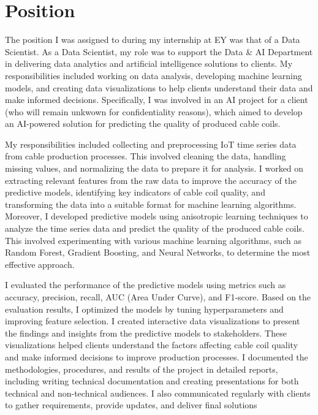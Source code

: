 \section{Position}

The position I was assigned to during my internship at EY was that of a Data
Scientist. As a Data Scientist, my role was to support the Data \& AI
Department in delivering data analytics and artificial intelligence solutions
to clients. My responsibilities included working on data analysis, developing
machine learning models, and creating data visualizations to help clients
understand their data and make informed decisions. Specifically, I was involved
in an AI project for a client (who will remain unkwown for confidentiality reasons),
which aimed to develop an AI-powered solution for predicting the quality of
produced cable coils.

My responsibilities included collecting and preprocessing IoT time series data
from cable production processes. This involved cleaning the data, handling
missing values, and normalizing the data to prepare it for analysis. I worked
on extracting relevant features from the raw data to improve the accuracy of
the predictive models, identifying key indicators of cable coil quality, and
transforming the data into a suitable format for machine learning algorithms.
Moreover, I developed predictive models using anisotropic learning techniques
to analyze the time series data and predict the quality of the produced cable
coils. This involved experimenting with various machine learning algorithms,
such as Random Forest, Gradient Boosting, and Neural Networks, to determine the
most effective approach.

I evaluated the performance of the predictive models using metrics such as
accuracy, precision, recall, AUC (Area Under Curve), and F1-score. Based on the
evaluation results, I optimized the models by tuning hyperparameters and
improving feature selection. I created interactive data visualizations to
present the findings and insights from the predictive models to stakeholders.
These visualizations helped clients understand the factors affecting cable coil
quality and make informed decisions to improve production processes. I
documented the methodologies, procedures, and results of the project in
detailed reports, including writing technical documentation and creating
presentations for both technical and non-technical audiences. I also
communicated regularly with clients to gather requirements, provide updates,
and deliver final solutions

